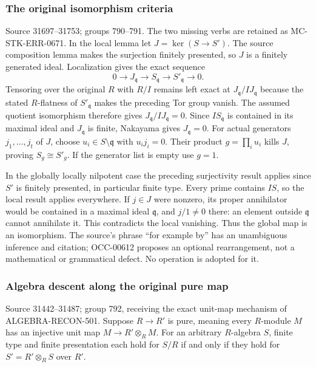 \subsubsection{The original isomorphism criteria}\label{algebra-proof-035-the-original-isomorphism-criteria}

Source 31697--31753; groups 790--791. The two missing verbs are retained as MC-STK-ERR-0671. In the local lemma let \(J=\ker(S\to S')\). The source composition lemma makes the surjection finitely presented, so \(J\) is a finitely generated ideal. Localization gives the exact sequence \[
0\to J_{\mathfrak q}\to S_{\mathfrak q}\to S'_{\mathfrak q}\to0.
\] Tensoring over the original \(R\) with \(R/I\) remains left exact at \(J_{\mathfrak q}/IJ_{\mathfrak q}\) because the stated \(R\)-flatness of \(S'_{\mathfrak q}\) makes the preceding Tor group vanish. The assumed quotient isomorphism therefore gives \(J_{\mathfrak q}/IJ_{\mathfrak q}=0\). Since \(IS_{\mathfrak q}\) is contained in its maximal ideal and \(J_{\mathfrak q}\) is finite, Nakayama gives \(J_{\mathfrak q}=0\). For actual generators \(j_1,\ldots,j_t\) of \(J\), choose \(u_i\in S\setminus\mathfrak q\) with \(u_i j_i=0\). Their product \(g=\prod_i u_i\) kills \(J\), proving \(S_g\cong S'_g\). If the generator list is empty use \(g=1\).

In the globally locally nilpotent case the preceding surjectivity result applies since \(S'\) is finitely presented, in particular finite type. Every prime contains \(IS\), so the local result applies everywhere. If \(j\in J\) were nonzero, its proper annihilator would be contained in a maximal ideal \(\mathfrak q\), and \(j/1\ne0\) there: an element outside \(\mathfrak q\) cannot annihilate it. This contradicts the local vanishing. Thus the global map is an isomorphism. The source's phrase ``for example by'' has an unambiguous inference and citation; OCC-00612 proposes an optional rearrangement, not a mathematical or grammatical defect. No operation is adopted for it.

\subsubsection{Algebra descent along the original pure map}\label{algebra-proof-035-algebra-descent-along-the-original-pure-map}

Source 31442--31487; group 792, receiving the exact unit-map mechanism of ALGEBRA-RECON-501. Suppose \(R\to R'\) is pure, meaning every \(R\)-module \(M\) has an injective unit map \(M\to R'\otimes_R M\). For an arbitrary \(R\)-algebra \(S\), finite type and finite presentation each hold for \(S/R\) if and only if they hold for \(S'=R'\otimes_R S\) over \(R'\).

